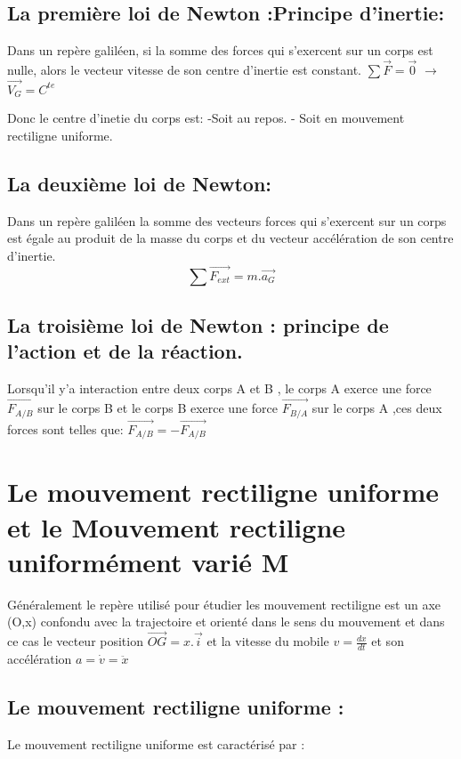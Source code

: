 \documentclass[12pt]{article}
\begin{document}
\subsection{La première loi de Newton :Principe d'inertie:} 
Dans un repère galiléen, si la somme des forces qui s'exercent sur un corps est nulle, alors le vecteur vitesse de son centre
d'inertie est constant. $\sum \vec{F} = \vec{0}$ $\rightarrow$ $\vec{V_G} = C^{te}$

Donc le centre d'inetie du corps est:
-Soit au repos. \hspace{2cm }- Soit en mouvement rectiligne uniforme.

\subsection{La deuxième loi de Newton:}
Dans un repère galiléen la somme des vecteurs forces qui s'exercent sur un corps est égale au produit de la masse du
corps et du vecteur accélération de son centre d'inertie.$$\sum \vec{F_{ext}} = m.\vec{a_G}$$

\subsection{La troisième loi de Newton : principe de l'action et de la réaction.}

Lorsqu'il y'a interaction entre deux corps A et B , le corps A exerce une force $\vec{F_{A/B}}$ sur le corps B et le corps B exerce une force $\vec{F_{B/A}}$ sur le corps A ,ces deux forces sont telles que: $\vec{F_{A/B}} = -\vec{F_{A/B}}$


\section{Le mouvement rectiligne uniforme et le Mouvement rectiligne uniformément varié M}

Généralement le repère utilisé pour étudier les mouvement rectiligne est un axe (O,x) confondu avec la trajectoire et orienté
dans le sens du mouvement et dans ce cas le vecteur position $\vec{OG} = x.\vec{i}$ et la vitesse du mobile $v = \frac{dx}{dt}$ et son accélération $a =\dot{v}=\ddot{x}$

\subsection{Le mouvement rectiligne uniforme : } 
Le mouvement rectiligne uniforme est caractérisé par :
\end{document}
